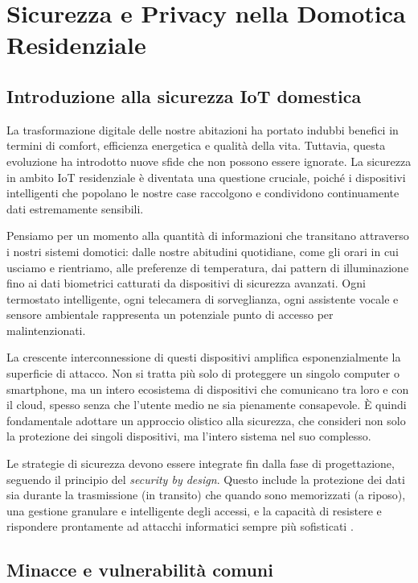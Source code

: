 \chapter{Sicurezza e Privacy nella Domotica Residenziale}

\section{Introduzione alla sicurezza IoT domestica}

La trasformazione digitale delle nostre abitazioni ha portato indubbi benefici in termini di comfort, efficienza energetica e qualità della vita. Tuttavia, questa evoluzione ha introdotto nuove sfide che non possono essere ignorate. La sicurezza in ambito IoT residenziale è diventata una questione cruciale, poiché i dispositivi intelligenti che popolano le nostre case raccolgono e condividono continuamente dati estremamente sensibili.

Pensiamo per un momento alla quantità di informazioni che transitano attraverso i nostri sistemi domotici: dalle nostre abitudini quotidiane, come gli orari in cui usciamo e rientriamo, alle preferenze di temperatura, dai pattern di illuminazione fino ai dati biometrici catturati da dispositivi di sicurezza avanzati. Ogni termostato intelligente, ogni telecamera di sorveglianza, ogni assistente vocale e sensore ambientale rappresenta un potenziale punto di accesso per malintenzionati.

La crescente interconnessione di questi dispositivi amplifica esponenzialmente la superficie di attacco. Non si tratta più solo di proteggere un singolo computer o smartphone, ma un intero ecosistema di dispositivi che comunicano tra loro e con il cloud, spesso senza che l'utente medio ne sia pienamente consapevole. È quindi fondamentale adottare un approccio olistico alla sicurezza, che consideri non solo la protezione dei singoli dispositivi, ma l'intero sistema nel suo complesso.

Le strategie di sicurezza devono essere integrate fin dalla fase di progettazione, seguendo il principio del \textit{security by design}. Questo include la protezione dei dati sia durante la trasmissione (in transito) che quando sono memorizzati (a riposo), una gestione granulare e intelligente degli accessi, e la capacità di resistere e rispondere prontamente ad attacchi informatici sempre più sofisticati \parencite{roman2013, sicari2015}.

\section{Minacce e vulnerabilità comuni}


